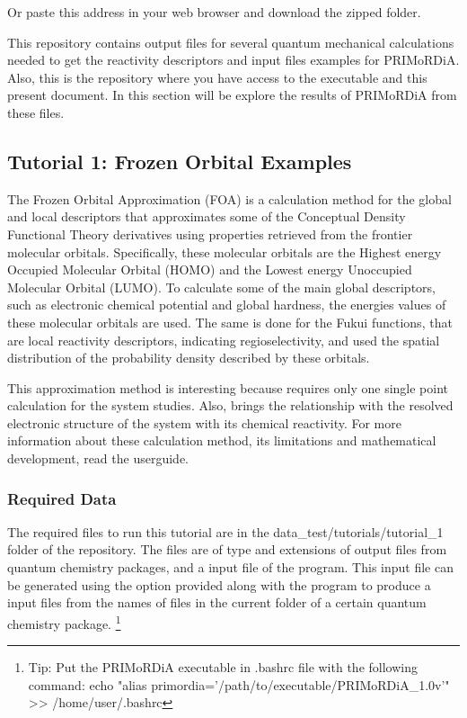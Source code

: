 \documentclass[a4paper,11pt]{refart}
\begin{document}
Or paste this address in your web browser and download the zipped folder.

This repository contains output files for several quantum mechanical calculations needed to get the reactivity descriptors and input files examples for PRIMoRDiA. Also, this is the repository where you have access to the executable and this present document. In this section will be explore the results of PRIMoRDiA from these files.

\subsection{Tutorial 1: Frozen Orbital Examples }

The Frozen Orbital Approximation (FOA) is a calculation method for the global and local descriptors that approximates some of the Conceptual Density Functional Theory derivatives using properties retrieved from the frontier molecular orbitals. Specifically, these molecular orbitals are the Highest energy Occupied Molecular Orbital (HOMO) and the Lowest energy Unoccupied Molecular Orbital (LUMO). To calculate some of the main global descriptors, such as electronic chemical potential and global hardness, the energies values of these molecular orbitals are used. The same is done for the Fukui functions, that are local reactivity descriptors, indicating regioselectivity, and used the spatial distribution of the probability density described by these orbitals.

This approximation method is interesting because requires only one single point calculation for the system studies. Also, brings the relationship with the resolved electronic structure of the system with its chemical reactivity. For more information about these calculation method, its limitations and mathematical development, read the userguide.

\subsubsection{Required Data} 

The required files to run this tutorial are in the data\_test/tutorials/tutorial\_1 folder of the repository. 
The files are of type and extensions of output files from quantum chemistry packages, and a input file of the program. 
This input file can be generated using the option provided along with the program to produce a input files from the names of files in the current folder of a certain quantum chemistry package. \footnote{Tip: Put the PRIMoRDiA executable in .bashrc file with the following command: echo "alias primordia='/path/to/executable/PRIMoRDiA\_1.0v'" >> /home/user/.bashrc }
\end{document}
